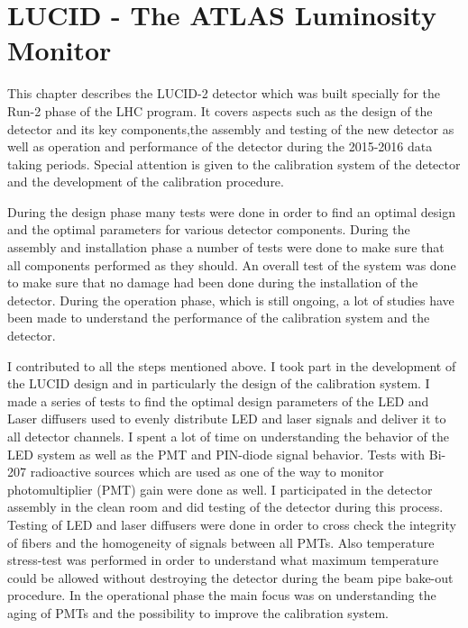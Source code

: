 \chapter{LUCID - The ATLAS Luminosity Monitor}
\label{chap:LUCID}


This chapter describes the LUCID-2 detector which was built specially for the Run-2 phase of the LHC program.
It covers aspects such as the design of the detector and its key components,the assembly and testing of the new detector as well as
operation and performance of the detector during the 2015-2016 data taking periods.
Special attention is given to the calibration system of the detector and the development of the calibration procedure.

During the design phase many tests were done in order to find an optimal design and the optimal parameters for various detector components.
During the assembly and installation phase a number of tests were done to make sure that all components performed as they should.
An overall test of the system was done to make sure that no damage had been done during the installation of the detector.
During the operation phase, which is still ongoing, a lot of studies have been made to understand the performance of the calibration system and the detector.

I contributed to all the steps mentioned above. I took part in the development of the LUCID design and in particularly the design of the calibration system. 
I made a series of tests to find the optimal design parameters of the LED and Laser diffusers used to evenly distribute LED and laser signals and deliver it to all detector 
channels. 
I spent a lot of time on understanding the behavior of the LED system as well as the PMT and PIN-diode signal behavior.
Tests with Bi-207 radioactive sources which are used as one of the way to monitor photomultiplier (PMT) gain were done as well.
I participated in the detector assembly in the clean room and did testing of the detector during this process.
Testing of LED and laser diffusers were done in order to cross check the integrity of fibers and the homogeneity of signals between all PMTs.
Also temperature stress-test was performed in order to understand what maximum temperature could be allowed without destroying the detector during the 
beam pipe bake-out procedure.
In the operational phase the main focus was on understanding the aging of PMTs and the possibility to improve the calibration system.


